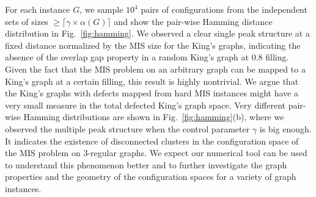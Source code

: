 \documentclass[onefignum, onetabnum]{siamart190516}
\newcommand{\<}{\langle}
\renewcommand{\>}{\rangle}
\newcommand{\Fig}[1]{Fig.~\ref{#1}}
\begin{document}
For each instance $G$, we sample $10^4$ pairs of configurations from the independent sets of sizes $\geq \lceil \gamma \times \alpha(G)\rceil$ and show the pair-wise Hamming distance distribution in \Fig{fig:hamming}.
We observed a clear single peak structure at a fixed distance normalized by the MIS size for the King's graphs, indicating the absence of the overlap gap property in a random King's graph at $0.8$ filling.
Given the fact that the MIS problem on an arbitrary graph can be mapped to a King's graph at a certain filling, this result is highly nontrivial.
We argue that the King's graphs with defects mapped from hard MIS instances might have a very small measure in the total defected King's graph space.
Very different pair-wise Hamming distributions are shown in \Fig{fig:hamming}(b), where we observed the multiple peak structure when the control parameter $\gamma$ is big enough. It indicates the existence of disconnected clusters in the configuration space of the MIS problem on $3$-regular graphs.
We expect our numerical tool can be used to understand this phenomenon better and to further investigate the graph properties and the geometry of the configuration spaces for a variety of graph instances.
\end{document}
